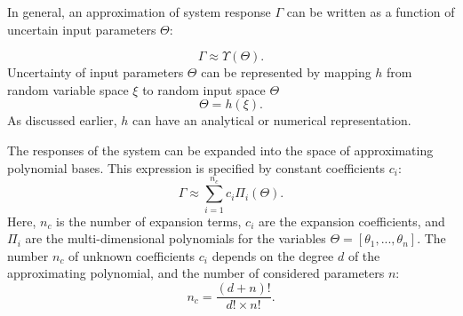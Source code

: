 In general, an approximation of system response $\Gamma$ can be written as a
function of uncertain input parameters $\Theta$:

\begin{equation}
  \Gamma\approx\Upsilon(\Theta).
  \label{eq:1}
\end{equation} 
%
Uncertainty of input parameters $\Theta$ can be represented by mapping $h$ from
random variable space $\xi$ to random input space $\Theta$%
\begin{equation}
  \Theta=h(\xi).
  \label{eq:rand}
\end{equation} As discussed earlier, $h$ can have an analytical or numerical
representation.



The responses of the system can be expanded into the
space of approximating polynomial bases. This expression is specified by constant coefficients $c_i$:
%
\begin{equation}
\Gamma\approx\underset{i=1}{\overset{n_c}{\sum}}c_{i}\Pi_{i}(\Theta).
  \label{eq:exp}
\end{equation} Here, $n_c$ is the number of expansion terms, $c_{i}$ are the
expansion coefficients, and
$\Pi_{i}$ are the multi-dimensional polynomials for the variables
$\Theta=[\theta_{1},...,\theta_{n}]$. The number $n_c$ of unknown
coefficients $c_{i}$ depends on the degree $d$ of the approximating polynomial,
and the number of considered parameters $n$:
%
\begin{equation}
 n_c=\frac{(d+n)!}{d!\times n!}.
 \label{eq:np}
\end{equation}
%

